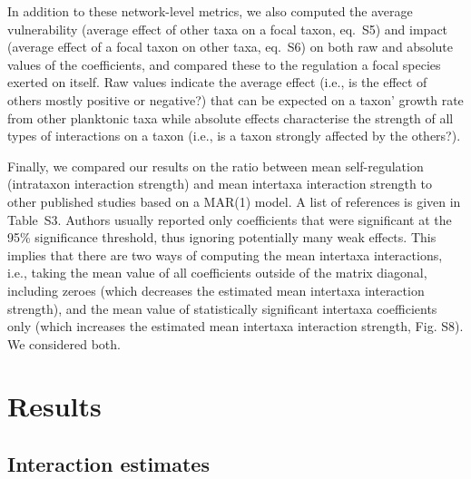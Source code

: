 \documentclass[10pt]{article}
\begin{document}
In addition to these network-level metrics, we also computed the average
vulnerability (average effect of other taxa on a focal taxon, eq.~S5)
and impact (average effect of a focal taxon on other taxa, eq.~S6)
on both raw and absolute values of the coefficients, and compared
these to the regulation a focal species exerted on itself. Raw values
indicate the average effect (i.e., is the effect of others mostly
positive or negative?) that can be expected on a taxon' growth rate
from other planktonic taxa while absolute effects characterise
the strength of all types of interactions on a taxon (i.e., is a taxon
strongly affected by the others?).

Finally, we compared our results on the ratio between mean self-regulation
(intrataxon interaction strength) and mean intertaxa interaction strength
to other published studies based on a MAR(1) model. A list of references
is given in Table~S3. Authors usually reported only coefficients
that were significant at the 95\% significance threshold, thus ignoring
potentially many weak effects. This implies that there are two ways
of computing the mean intertaxa interactions, i.e., taking the mean
value of all coefficients outside of the matrix diagonal, including
zeroes (which decreases the estimated mean intertaxa interaction strength),
and the mean value of statistically significant intertaxa coefficients
only (which increases the estimated mean intertaxa interaction strength,
Fig. S8). We considered both. 

\section*{Results}

\subsection*{Interaction estimates}
\end{document}
